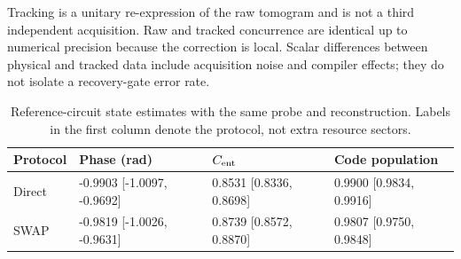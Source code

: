 \documentclass[10pt,a4paper]{article}
\begin{document}
Tracking is a unitary re-expression of the raw tomogram and is not a third independent acquisition. Raw and tracked concurrence are identical up to numerical precision because the correction is local. Scalar differences between physical and tracked data include acquisition noise and compiler effects; they do not isolate a recovery-gate error rate.\par\begin{table}[htbp]\centering\small
\caption{Reference-circuit state estimates with the same probe and reconstruction. Labels in the first column denote the protocol, not extra resource sectors.}\label{stab:state_baselines}
\begin{tabular}{llll}\toprule
Protocol & Phase (rad) & $C_{\rm ent}$ & Code population\\\midrule
Direct & -0.9903 [-1.0097, -0.9692] & 0.8531 [0.8336, 0.8698] & 0.9900 [0.9834, 0.9916] \\
SWAP & -0.9819 [-1.0026, -0.9631] & 0.8739 [0.8572, 0.8870] & 0.9807 [0.9750, 0.9848] \\
\bottomrule\end{tabular}\end{table}\par
\clearpage
\end{document}
